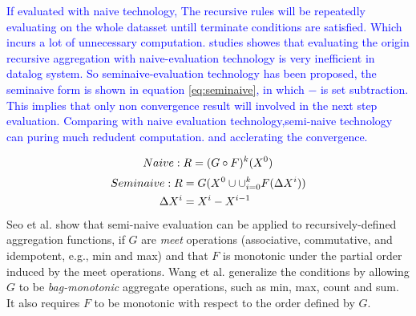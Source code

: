 \textcolor{blue}{If evaluated with naive technology, The recursive rules will be repeatedly evaluating on the whole datasset untill terminate conditions are satisfied. Which incurs a lot of unnecessary computation. studies\cite{Seo:2013:DSD:2556549.2556572,Wang:2015:AFR:2824032.2824052,Lam:2013:SDE:2510649.2511289} showes that evaluating the origin recursive aggregation with naive-evaluation technology is very inefficient in datalog system. So seminaive-evaluation technology has been proposed\cite{Lam:2013:SDE:2510649.2511289},  the seminaive form is shown in equation \ref{eq:seminaive}, in which $-$ is set subtraction. This implies that only non convergence result will involved in the next step evaluation. Comparing with naive evaluation technology,semi-naive technology can puring much redudent computation. and acclerating the convergence. }


	\begin{equation}
	\label{eq:naive}
	Naive:	R=(G\circ F)^k(X^0)\notag
	\end{equation}
\begin{equation}
\label{eq:seminaive}
\begin{aligned}
  Seminaive:	R&=G(X^0\cup \cup_{i=0}^{k}F(\Delta X^i) )\notag\\
    \Delta X^i&=X^i-X^{i-1}
\end{aligned}
\end{equation}
Seo et al. \cite{} show that semi-naive evaluation can be applied to recursively-defined aggregation functions, if $G$ are \textit{meet} operations (associative, commutative, and idempotent, e.g., min and max) and that $F$ is monotonic under the partial order induced by the meet operations. Wang et al. \cite{} generalize the conditions by allowing $G$ to be \textit{bag-monotonic} aggregate operations, such as min, max, count and sum. It also requires $F$ to be monotonic with respect to the order defined by $G$.

